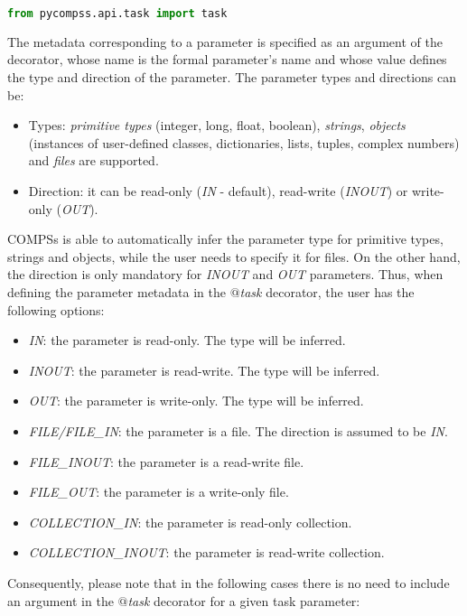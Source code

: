 \begin{lstlisting}[language=python]
from pycompss.api.task import task
\end{lstlisting}

The metadata corresponding to a parameter is specified as an argument of the decorator, whose name is 
the formal parameter's name and whose value defines the type and direction of the parameter. 
The parameter types and directions can be:

\begin{itemize}
 \item Types: {\it primitive types} (integer, long, float, boolean), {\it strings}, {\it objects} (instances of user-defined classes, dictionaries, lists, tuples, complex numbers) and {\it files} are supported.
 \item Direction: it can be read-only ({\it IN} - default), read-write ({\it INOUT}) or write-only ({\it OUT}).
\end{itemize}

COMPSs is able to automatically infer the parameter type for primitive types, strings and objects, 
while the user needs to specify it for files. On the other hand, the direction is only mandatory for 
{\it INOUT} and {\it OUT} parameters. Thus, when defining the parameter metadata in the {\it $@$task} 
decorator, the user has the following options:

\begin{itemize}
 \item {\it IN}: the parameter is read-only. The type will be inferred.
 \item {\it INOUT}: the parameter is read-write. The type will be inferred.
 \item {\it OUT}: the parameter is write-only. The type will be inferred.
 \item {\it FILE/FILE\_IN}: the parameter is a file. The direction is assumed to be {\it IN}.
 \item {\it FILE\_INOUT}: the parameter is a read-write file.
 \item {\it FILE\_OUT}: the parameter is a write-only file.
 \item {\it COLLECTION\_IN}: the parameter is read-only collection.
 \item {\it COLLECTION\_INOUT}: the parameter is read-write collection.
\end{itemize}

Consequently, please note that in the following cases there is no need to include an argument in 
the {\it $@$task} decorator for a given task parameter:

